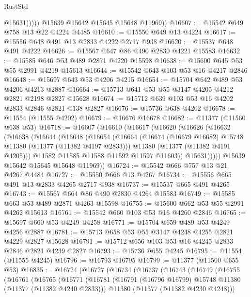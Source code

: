 \begin{lexlean}{RustStd}
\begin{coremodule}
                  @15631)))))
        @15639
        @15642
        @15645
        @15648
        @11969))
@16607 := @15542 @649 @758 @13 @22 @4224 @4485
@16610 := @15550 @649 @13 @4224
@16617 := @15556 @648 @491 @13 @2833 @4222 @2717 @938
@16620 := @15537 @648 @491 @4222
@16626 := @15567 @647 @86 @490 @2830 @4221 @15583
@16632 := @15585 @646 @53 @489 @2871 @4220 @15598
@16638 := @15600 @645 @53 @55 @2991 @4219 @15613
@16644 := @15542 @643 @103 @53 @16 @4217 @2846
@16648 := @15697 @643 @53 @4206 @4215
@16654 := @15704 @642 @489 @53 @4206 @4213 @2887
@16664 := @15713 @641 @53 @55 @3147 @4205 @4212 @2821 @2198 @2827 @15628
@16674 := @15712 @639 @103 @53 @16 @4202 @2833 @2846 @2821 @138 @2827
@16676 := @15736 @638 @4202
@16678 := @11554 (@11555 @4202)
@16679 := @16676 @16678
@16682 := @11377 (@11560 @638 @53)
@16718 := @16607
    (@16610
      (@16617
        (@16620
          (@16626
            (@16632
              (@16638
                (@16644
                  (@16648
                    (@16654
                      (@16664
                        (@16674 (@16679 @16682) @15748 @11380 (@11377 (@11382 @4197 @2833)))
                        @11380
                        (@11377 (@11382 @4191 @4205)))
                      @11582
                      @11585
                      @11588
                      @11592
                      @11597
                      @11603))
                  @15631)))))
        @15639
        @15642
        @15645
        @15648
        @11969))
@16724 := @15542 @666 @757 @13 @21 @4267 @4484
@16727 := @15550 @666 @13 @4267
@16734 := @15556 @665 @491 @13 @2833 @4265 @2717 @938
@16737 := @15537 @665 @491 @4265
@16743 := @15567 @664 @86 @490 @2830 @4264 @15583
@16749 := @15585 @663 @53 @489 @2871 @4263 @15598
@16755 := @15600 @662 @53 @55 @2991 @4262 @15613
@16761 := @15542 @660 @103 @53 @16 @4260 @2846
@16765 := @15697 @660 @53 @4249 @4258
@16771 := @15704 @659 @489 @53 @4249 @4256 @2887
@16781 := @15713 @658 @53 @55 @3147 @4248 @4255 @2821 @4229 @2827 @15628
@16791 := @15712 @656 @103 @53 @16 @4245 @2833 @2846 @2821 @4239 @2827
@16793 := @15736 @655 @4245
@16795 := @11554 (@11555 @4245)
@16796 := @16793 @16795
@16799 := @11377 (@11560 @655 @53)
@16835 := @16724
    (@16727
      (@16734
        (@16737
          (@16743
            (@16749
              (@16755
                (@16761
                  (@16765
                    (@16771
                      (@16781
                        (@16791 (@16796 @16799) @15748 @11380 (@11377 (@11382 @4240 @2833)))
                        @11380
                        (@11377 (@11382 @4230 @4248)))

\end{coremodule}
\end{lexlean}

